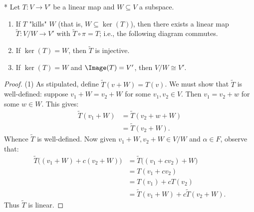     \begin{theorem}*
        Let $T:V \rightarrow V'$ be a linear map and $W \subseteq V$ a subspace.
        \begin{enumerate}[label = (\arabic*),itemsep=1pt,topsep=3pt]
            \item If $T$ "kills" $W$ (that is, $W \subseteq \ker(T)$), then there exists a linear map $\widetilde{T}:V/W \rightarrow V'$ with $\widetilde{T} \circ \pi = T$; i.e., the following diagram commutes.
                \begin{center}
                \end{center}

            \item If $\ker(T) = W$, then $\widetilde{T}$ is injective.
            \item If $\ker(T) = W$ and $\Image(T) = V'$, then $V/W \cong V'$.
        \end{enumerate}
    \end{theorem}
        \begin{proof}
            (1) As stipulated, define $\widetilde{T}(v+W) = T(v)$. We must show that $\widetilde{T}$ is well-defined: suppose $v_1 + W = v_2 + W$ for some $v_1,v_2 \in V$. Then $v_1 = v_2 + w$ for some $w \in W$. This gives:
                \begin{equation*}
                \begin{split}
                    \widetilde{T}(v_1 + W)
                    & = \widetilde{T}(v_2 + w + W) \\
                    & = \widetilde{T}(v_2 + W).
                \end{split}
                \end{equation*}
            Whence $\widetilde{T}$ is well-defined. Now given $v_1 + W, v_2 +W \in V/W$ and $\alpha \in F$, observe that:
                \begin{equation*}
                \begin{split}
                    \widetilde{T}\bigl((v_1 + W) + c (v_2 + W)\bigr)
                    & = \widetilde{T}\bigl( (v_1 + cv_2) + W\bigr) \\
                    & = T(v_1 + cv_2) \\
                    & = T(v_1) + cT(v_2) \\
                    & = \widetilde{T}(v_1 + W) + c \widetilde{T}(v_2 + W). 
                \end{split}
                \end{equation*}
            Thus $\widetilde{T}$ is linear.
        \end{proof}

